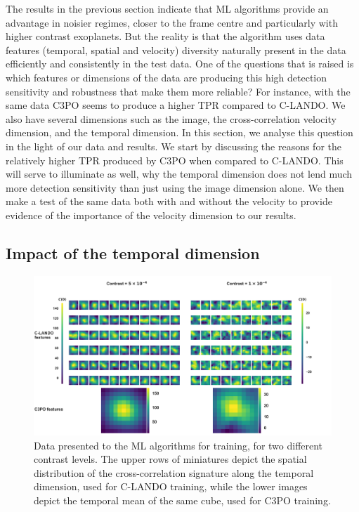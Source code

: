 \documentclass{aa}
\begin{document}
The results in the previous section indicate that ML algorithms provide an advantage in noisier regimes, closer to the frame centre and particularly with higher contrast exoplanets.
But the reality is that the algorithm uses data features (temporal, spatial and velocity) diversity naturally present in the data efficiently and consistently in the test data.
One of the questions that is raised is which features or dimensions of the data are producing this high detection sensitivity and robustness that make them more reliable?
For instance, with the same data C3PO seems to produce a higher TPR compared to C-LANDO.
We also have several dimensions such as the image, the cross-correlation velocity dimension, and the temporal dimension.
In this section, we  analyse this question in the light of our data and results.
We start by discussing the reasons for the relatively higher TPR produced by C3PO when compared to C-LANDO.
This will serve to illuminate as well, why the temporal dimension does not lend much more detection sensitivity than just using the image dimension alone.
We  then make a test of the same data both with and without the velocity to provide evidence of the importance of the velocity dimension to our results.

\subsection{Impact of the temporal dimension}

\begin{figure}
\centering
\includegraphics[width=\textwidth]{fig5_disc_dec2023_cropped.png}
\caption{Data presented to the ML algorithms for training, for two different contrast levels. The upper rows of miniatures depict the spatial distribution of the cross-correlation signature along the temporal dimension, used for C-LANDO training, while the lower images depict the temporal mean of the same cube, used for C3PO training. }
\label{fig:disc-part1}
\end{figure}
\end{document}
